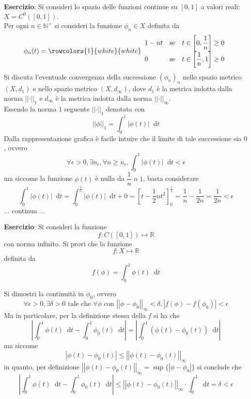 \documentclass[a4paper]{extarticle}
\newcommand*\dif{\mathop{}\!\mathrm{d}}
\begin{document}
\vspace{1em}
\noindent
\textbf{Esercizio}: Si consideri lo spazio delle funzioni continue su $[0,1]$ a valori reali: $X=C^0([0,1])$.\\
Per ogni $n \in \mathbb{N}^+$ si consideri la funzione $\phi_n \in X$ definita da
\[
    \phi_n(t) = \rowcolors{1}{white}{white}    
    \begin{array}{lll}
        1-nt & \text{se} & t \in \left[0,\dfrac{1}{n}\right] \geq 0\\
        0   & \text{se} & t \in \left[\dfrac{1}{n},1\right] \geq 0\\
    \end{array}
\]
Si discuta l'eventuale convergenza della successione $(\phi_n)_n$ nello spazio metrico $(X,d_1)$ e nello spazio metrico $(X,d_\infty)$, dove $d_1$ è la metrica indotta dalla norma $\left \vert \left \vert \cdot \right \vert \right \vert_1$ e $d_\infty$ è la metrica indotta dalla norma $\left \vert \left \vert \cdot \right \vert \right \vert_\infty$.\\
Essendo la norma $1$ seguente $\left \vert \left \vert \cdot \right \vert \right \vert_1$ denotata con
\[\left \vert \left \vert \phi \right \vert \right \vert_1 = \int_0^1 \left \vert \phi(t) \right \vert \dif t\]
Dalla rappresentazione grafica è facile intuire che il limite di tale successione sia $0$, ovvero
\[\forall \epsilon > 0, \exists n_\epsilon, \forall n \geq n_\epsilon, \int_0^1 \left \vert \phi(t) \right \vert \dif t < \epsilon\]
ma siccome la funzione $\phi(t)$ è nulla da $\dfrac{1}{n}$ a $1$, basta considerare
\[\int_0^1 \left \vert \phi(t) \right \vert \dif t = \int_0^\frac{1}{n} \left \vert \phi(t) \right \vert \dif t + 0 = \left[t-\frac{1}{2}nt^2\right]_0^\frac{1}{n} = \frac{1}{n} - \frac{1}{2n} = \frac{1}{2n} < \epsilon\]
... continua ...

\vspace{2em}
\noindent
\textbf{Esercizio}: Si consideri la funzione
\[f : C([0,1]) \longmapsto \mathbb{R}\]
con norma infinito. Si provi che la funzione
\[f : X \longmapsto \mathbb{R}\]
definita da
\[f(\phi) = \int_0^1 \phi(t) \dif t\]

\vspace{1em}
\noindent
Si dimostri la continuità in $\phi_0$, ovvero
\[\forall \epsilon > 0, \exists \delta > 0 \text{ tale che } \forall \phi \text{ con } \left \vert \left \vert \phi-\phi_0 \right \vert \right \vert_\infty < \delta, \left \vert f(\phi) - f(\phi_0) \right \vert < \epsilon\]
Ma in particolare, per la definizione stessa della $f$ si ha che
\[\left \vert \int_0^1 \phi(t) \dif t - \int_0^1 \phi_0(t) \dif t\right \vert = \left \vert \int_0^1 (\phi(t) - \phi_0(t)) \dif t \right \vert\]
ma siccome
\[\left \vert \phi(t) - \phi_0(t) \right \vert \leq \left \vert \left \vert \phi(t) - \phi_0(t) \right \vert \right \vert_{\infty}\]
in quanto, per definizione $\left \vert \left \vert \phi(t) - \phi_0(t) \right \vert \right \vert_{\infty} = \sup\{\left \vert \phi-\phi_0 \right \vert\}$
si conclude che 
\[\left \vert \int_0^1 \phi(t) \dif t - \int_0^1 \phi_0(t) \dif t\right \vert \leq \left \vert \left \vert \phi(t) - \phi_0(t) \right \vert \right \vert_{\infty} \cdot \int_0^1 \dif t = \delta < \epsilon\]
\end{document}
